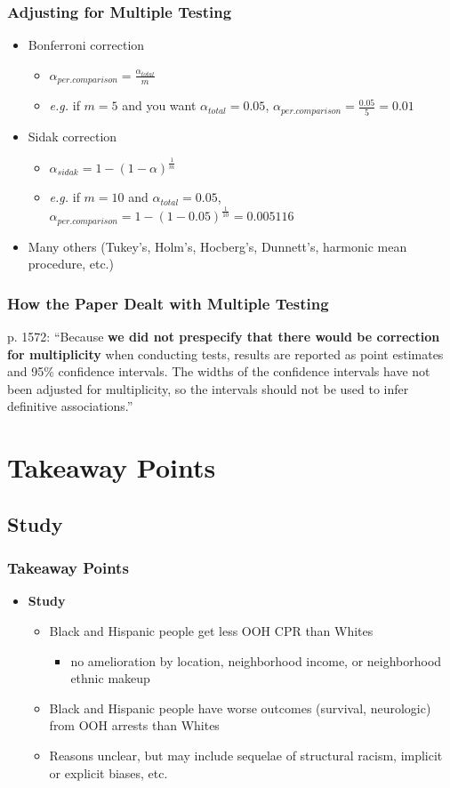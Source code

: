 \documentclass{beamer}
\begin{document}
			\begin{frame}
				\frametitle{Adjusting for Multiple Testing}
					\begin{itemize}
					\item Bonferroni correction
						\begin{itemize}
							\item $\alpha_{per.comparison}=\frac{\alpha_{total}}{m}$
							\item \textit{e.g.} if $m = 5$ and you want $\alpha_{total} = 0.05$, $\alpha_{per.comparison}=\frac{0.05}{5}=0.01$
						\end{itemize}
					\item Sidak correction
						\begin{itemize}
							\item $\alpha_{sidak} = 1 - (1-\alpha)^{\frac{1}{m}}$
							\item \textit{e.g.} if $m = 10$ and $\alpha_{total} = 0.05$, $\alpha_{per.comparison}= 1 - (1-0.05)^{\frac{1}{10}}= 0.005116$
						\end{itemize}
					\pause
				\item Many others (Tukey's, Holm's, Hocberg's, Dunnett's, harmonic mean procedure, etc.)
					\end{itemize}	
			\end{frame}
		\begin{frame}
			\frametitle{How the Paper Dealt with Multiple Testing}
				p. 1572: ``Because \textbf{we did not prespecify that there would be correction for multiplicity} when conducting tests, results are reported as point estimates and 95\% confidence intervals. The widths of the confidence intervals have not been adjusted for multiplicity, so the intervals should not be used to infer definitive associations.''
		\end{frame}
\section{Takeaway Points}
	\subsection{Study}
		\begin{frame}
			\frametitle{Takeaway Points}
				\begin{itemize}
					\item \textbf{Study}
						\begin{itemize}
							\item Black and Hispanic people get less OOH CPR than Whites
								\begin{itemize}
									\item no amelioration by location, neighborhood income, or neighborhood ethnic makeup
								\end{itemize}
							\pause
							\item Black and Hispanic people have worse outcomes (survival, 	neurologic) from OOH arrests than Whites
							\item Reasons unclear, but may include sequelae of structural racism, implicit or explicit biases, etc.
						\end{itemize}
				\end{itemize}
		\end{frame}
\end{document}
